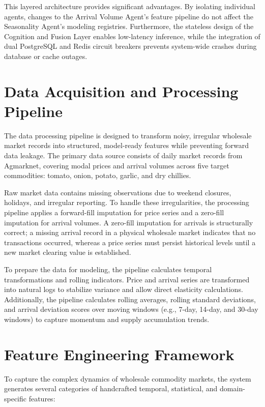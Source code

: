 \documentclass[12pt,a4paper]{report}
\theoremstyle{definition}
\theoremstyle{remark}
\begin{document}
This layered architecture provides significant advantages. By isolating individual agents, changes to the Arrival Volume Agent's feature pipeline do not affect the Seasonality Agent's modeling registries. Furthermore, the stateless design of the Cognition and Fusion Layer enables low-latency inference, while the integration of dual PostgreSQL and Redis circuit breakers prevents system-wide crashes during database or cache outages.

\section{Data Acquisition and Processing Pipeline}

The data processing pipeline is designed to transform noisy, irregular wholesale market records into structured, model-ready features while preventing forward data leakage. The primary data source consists of daily market records from Agmarknet, covering modal prices and arrival volumes across five target commodities: tomato, onion, potato, garlic, and dry chillies.

Raw market data contains missing observations due to weekend closures, holidays, and irregular reporting. To handle these irregularities, the processing pipeline applies a forward-fill imputation for price series and a zero-fill imputation for arrival volumes. A zero-fill imputation for arrivals is structurally correct; a missing arrival record in a physical wholesale market indicates that no transactions occurred, whereas a price series must persist historical levels until a new market clearing value is established.

To prepare the data for modeling, the pipeline calculates temporal transformations and rolling indicators. Price and arrival series are transformed into natural logs to stabilize variance and allow direct elasticity calculations. Additionally, the pipeline calculates rolling averages, rolling standard deviations, and arrival deviation scores over moving windows (e.g., 7-day, 14-day, and 30-day windows) to capture momentum and supply accumulation trends.

\section{Feature Engineering Framework}

To capture the complex dynamics of wholesale commodity markets, the system generates several categories of handcrafted temporal, statistical, and domain-specific features:
\end{document}
